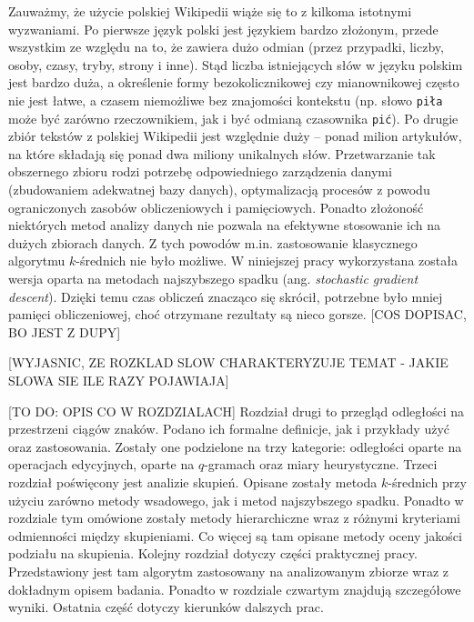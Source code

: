 \documentclass{praca1}
\begin{document}
Zauważmy, że użycie polskiej Wikipedii wiąże się to z kilkoma istotnymi wyzwaniami. Po pierwsze język polski jest językiem bardzo złożonym, przede wszystkim ze względu na to, że zawiera dużo odmian (przez przypadki, liczby, osoby, czasy, tryby, strony i inne). Stąd liczba istniejących słów w języku polskim jest bardzo duża, a określenie formy bezokolicznikowej czy mianownikowej często nie jest łatwe, a czasem niemożliwe bez znajomości kontekstu (np. słowo \verb|piła| może być zarówno rzeczownikiem, jak i być odmianą czasownika \verb|pić|). Po drugie zbiór tekstów z polskiej Wikipedii jest względnie duży -- ponad milion artykułów,  na które składają się ponad dwa miliony unikalnych słów. Przetwarzanie tak obszernego zbioru rodzi potrzebę odpowiedniego zarządzenia danymi (zbudowaniem adekwatnej bazy danych), optymalizacją procesów z powodu ograniczonych zasobów obliczeniowych i pamięciowych. Ponadto złożoność niektórych metod analizy danych nie pozwala na efektywne stosowanie ich na dużych zbiorach danych. Z tych powodów m.in. zastosowanie klasycznego algorytmu $k$-średnich nie było możliwe. W niniejszej pracy wykorzystana została wersja oparta na metodach najszybszego spadku (ang. \emph{stochastic gradient descent}). Dzięki temu czas obliczeń znacząco się skrócił, potrzebne było mniej pamięci obliczeniowej, choć otrzymane rezultaty są nieco gorsze. [COS DOPISAC, BO JEST Z DUPY]

[WYJASNIC, ZE ROZKLAD SLOW CHARAKTERYZUJE TEMAT - JAKIE SLOWA SIE ILE RAZY POJAWIAJA]

[TO DO: OPIS CO W ROZDZIALACH]
Rozdział drugi to przegląd odległości na przestrzeni ciągów znaków.  Podano ich formalne definicje, jak i przykłady użyć oraz zastosowania. Zostały one podzielone na trzy kategorie: odległości oparte na operacjach edycyjnych, oparte na $q$-gramach oraz miary heurystyczne. Trzeci rozdział poświęcony jest analizie skupień. Opisane zostały metoda $k$-średnich przy użyciu zarówno metody wsadowego, jak i metod najszybszego spadku. Ponadto w rozdziale tym omówione zostały metody hierarchiczne wraz z różnymi kryteriami odmienności między skupieniami. Co więcej są tam opisane metody oceny jakości podziału na skupienia. Kolejny rozdział dotyczy części praktycznej pracy. Przedstawiony jest tam algorytm zastosowany na analizowanym zbiorze wraz z dokładnym opisem badania. Ponadto w rozdziale czwartym znajdują szczegółowe wyniki. Ostatnia część dotyczy kierunków dalszych prac.
\end{document}
